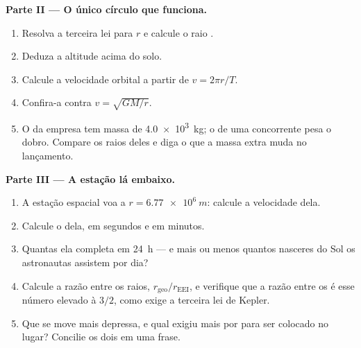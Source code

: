 \begin{problem}
\medskip
\noindent\textbf{Parte II --- O único círculo que funciona.}
\begin{enumerate}[resume]
  \item Resolva a terceira lei para $r$ e calcule o raio .
  \item Deduza a altitude acima do solo.
  \item Calcule a velocidade orbital a partir de $v = 2\pi r/T$.
  \item Confira-a contra $v = \sqrt{GM/r}$.
  \item O  da empresa tem massa de \qty{4.0e3}{kg}; o de uma concorrente pesa
        o dobro. Compare os raios  deles e diga o que a massa extra
        muda no lançamento.
\end{enumerate}

\medskip
\noindent\textbf{Parte III --- A estação lá embaixo.}
\begin{enumerate}[resume]
  \item A estação espacial voa a $r = \qty{6.77e6}{m}$: calcule a velocidade dela.
  \item Calcule o  dela, em segundos e em minutos.
  \item Quantas  ela completa em \qty{24}{h} --- e mais ou menos quantos
        nasceres do Sol os astronautas assistem por dia?
  \item Calcule a razão entre os raios, $r_{\text{geo}}/r_{\text{EEI}}$, e verifique
        que a razão entre os  é esse número elevado à  $3/2$, como
        exige a terceira lei de Kepler.
  \item Que  se move mais depressa, e qual exigiu mais  por 
        para ser colocado no lugar? Concilie os dois em uma frase.
\end{enumerate}


\end{problem}
